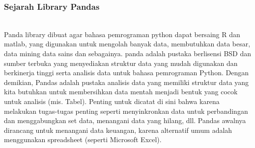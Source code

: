 \subsubsection{Sejarah Library Pandas}\\
Panda library dibuat agar bahasa pemrograman python dapat bersaing R dan matlab, yang digunakan untuk mengolah banyak data, membutuhkan data besar, data mining data sains dan sebagainya.
panda adalah pustaka berlisensi BSD dan sumber terbuka yang menyediakan struktur data yang mudah digunakan dan berkinerja tinggi serta analisis data untuk bahasa pemrograman Python.
Dengan demikian, Pandas adalah pustaka analisis data yang memiliki struktur data yang kita butuhkan untuk membersihkan data mentah menjadi bentuk yang cocok untuk analisis (mis. Tabel). Penting untuk dicatat di sini bahwa karena melakukan tugas-tugas penting seperti menyinkronkan data untuk perbandingan dan menggabungkan set data, menangani data yang hilang, dll. Pandas awalnya dirancang untuk menangani data keuangan, karena alternatif umum adalah menggunakan spreadsheet (seperti Microsoft Excel).

